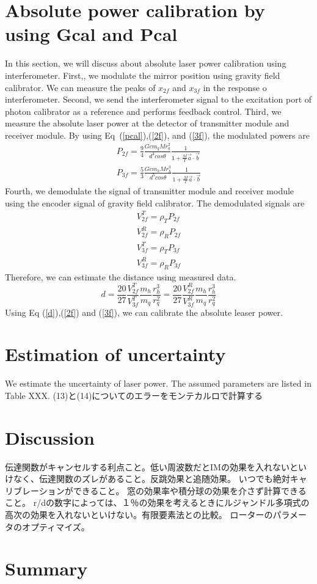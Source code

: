 \documentclass[12pt]{iopart}
\begin{document}
\section{Absolute power calibration by using Gcal and Pcal}
In this section, we will discuss about absolute laser power calibration using interferometer. 
First,, we modulate the mirror position using gravity field calibrator. We can measure the peaks of $x_{2f}$ and $x_{3f}$ in the response o interferometer. Second, we send the interferometer signal to the excitation port of photon calibrator as a reference and performs feedback control. Third, we measure the absolute laser power at the detector of transmitter module and receiver module. By using Eq~(\ref{pcal}),(\ref{2f}), and (\ref{3f}), the modulated powers are
\begin{eqnarray}
 P_{2f}=\frac{9}{4} \frac{Gcm_{q}Mr_{q}^2}{d^4cos\theta}\frac{1}{1+\frac{M}{I}\vec{a}\cdot \vec{b}} \label{2f} \\
 P_{3f}= \frac{5}{3} \frac{Gcm_{h}Mr_{h}^3}{d^5cos\theta}\frac{1}{1+\frac{M}{I}\vec{a}\cdot \vec{b}} \label{3f}
\end{eqnarray}
Fourth, we demodulate the signal of transmitter module and receiver module using the encoder signal of gravity field calibrator.
The demodulated signals are 
\begin{eqnarray}
V_{2f}^{T}=\rho_{T}P_{2f} \\
V_{2f}^{R}=\rho_{R}P_{2f} \\
V_{3f}^{T}=\rho_{T}P_{3f} \\
V_{3f}^{R}=\rho_{R}P_{3f} 
\end{eqnarray} 
Therefore, we can estimate the distance using measured data. 
\begin{equation}
d=\frac{20}{27} \frac{V_{2f}^T}{V_{3f}^T}\frac{m_{h}}{m_{q}}\frac{r_{h}^{3}}{r_{q}^{2}}=\frac{20}{27} \frac{V_{2f}^R}{V_{3f}^R}\frac{m_{h}}{m_{q}}\frac{r_{h}^{3}}{r_{q}^{2}} \label{d}
\end{equation}
Using Eq (\ref{d}),(\ref{2f}) and (\ref{3f}), we can calibrate the absolute leaser power.

\section{Estimation of uncertainty}
We estimate the uncertainty of laser power. The assumed parameters are listed in Table XXX. (13)と(14)についてのエラーをモンテカルロで計算する


\section{Discussion}
伝達関数がキャンセルする利点こと。低い周波数だとIMの効果を入れないといけなく、伝達関数のズレがあること。反跳効果と追随効果。
いつでも絶対キャリブレーションができること。
窓の効果率や積分球の効果を介さず計算できること。
r/dの数字によっては、１％の効果を考えるときにルジャンドル多項式の高次の効果を入れないといけない。有限要素法との比較。
ローターのパラメータのオプティマイズ。

\section{Summary}


\begin{verbatim}

\end{verbatim}
\end{document}
